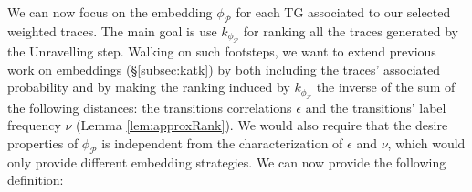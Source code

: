 {We can now focus on the embedding $\phi_{\mathcal{P}}$ for each TG associated to our selected weighted traces. The main goal is use $k_{\phi_\mathcal{P}}$ for ranking all the traces generated by the Unravelling step. Walking on such footsteps, we  want to extend  previous work on embeddings (\S\ref{subsec:katk}) by both including the traces' associated probability and by making the ranking induced by $k_{\phi_\mathcal{P}}$ the inverse of the sum of the following distances: the transitions correlations $\epsilon$ and the transitions' label frequency $\nu$ (Lemma \ref{lem:approxRank}). }
{We would also require that the desire properties of $\phi_{\mathcal{P}}$ is independent from the characterization of $\epsilon$ and $\nu$, which would only provide different embedding strategies. } We can now provide the following definition:


